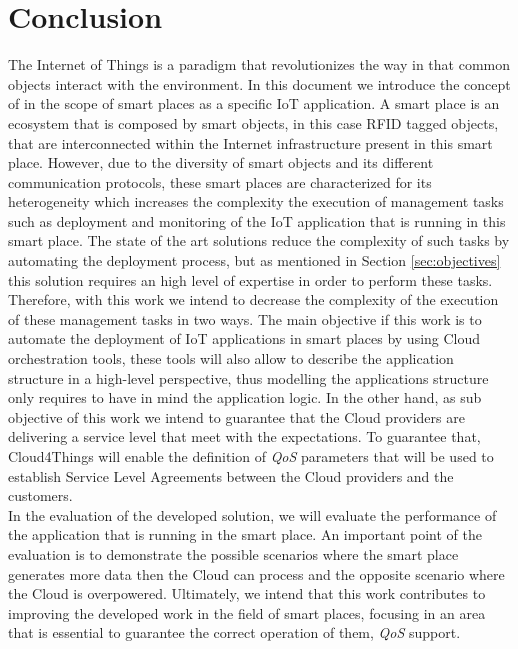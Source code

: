 \section{Conclusion}
\label{sec:conclusion}
The Internet of Things is a paradigm that revolutionizes the way in that common objects
interact with the environment. In this document we introduce the concept of in the scope of smart
places as a specific IoT application. A smart place is an ecosystem that is composed by smart objects,
in this case RFID tagged objects, that are interconnected within the Internet infrastructure present
in this smart place. However, due to the diversity of smart objects and its different communication
protocols, these smart places are characterized for its heterogeneity which increases the
complexity the execution of management tasks such as deployment and monitoring of the
IoT application that is running in this smart place. The state of the art solutions
reduce the complexity of such tasks by automating the deployment process, but as mentioned
in Section \ref{sec:objectives} this solution requires an high level of expertise in
order to perform these tasks.\\

Therefore, with this work we intend to decrease the complexity of the execution of these
management tasks in two ways. The main objective if this work is to automate the deployment
of IoT applications in smart places by using Cloud orchestration tools, these tools will also
allow to describe the application structure in a high-level perspective, thus modelling the applications
structure only requires to have in mind the application logic. In the other hand, as sub
objective of this work we intend to guarantee that the Cloud providers are delivering a service
level that meet with the expectations. To guarantee that, Cloud4Things will enable the
definition of \textit{QoS} parameters that will be used to establish Service Level Agreements
between the Cloud providers and the customers.\\

In the evaluation of the developed solution, we will evaluate the performance of the application
that is running in the smart place. An important point of the evaluation is to demonstrate the
possible scenarios where the smart place generates more data then the Cloud can process and the
opposite scenario where the Cloud is overpowered. Ultimately, we intend that this work contributes
to improving the developed work in the field of smart places, focusing in an area that is essential
to guarantee the correct operation of them, \textit{QoS} support.
